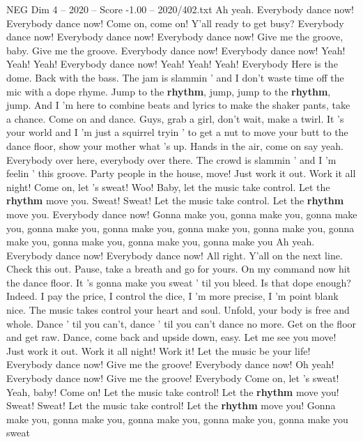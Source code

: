 \begin{textsample}{NEG Dim 4 – 2020 – Score -1.00 – 2020/402.txt}  \label{ex:f4_neg_028}
Ah yeah.
Everybody dance now!
Everybody dance now!
Come on, come on!
Y'all ready to get busy?
Everybody dance now!
Everybody dance now!
Everybody dance now!
Give me the groove, baby.
Give me the groove.
Everybody dance now!
Everybody dance now!
Yeah!
Yeah!
Yeah!
Everybody dance now!
Yeah!
Yeah!
Yeah!
Everybody Here is the dome.
Back with the bass.
The jam is slammin ' and I don't waste time off the mic with a dope rhyme.
Jump to the \textbf{rhythm}, jump, jump to the \textbf{rhythm}, jump.
And I 'm here to combine beats and lyrics to make the shaker pants, take a chance.
Come on and dance.
Guys, grab a girl, don't wait, make a twirl.
It 's your world and I 'm just a squirrel tryin ' to get a nut to move your butt to the dance floor, show your mother what 's up.
Hands in the air, come on say yeah.
Everybody over here, everybody over there.
The crowd is slammin ' and I 'm feelin ' this groove.
Party people in the house, move!
Just work it out.
Work it all night!
Come on, let 's sweat!
Woo!
Baby, let the music take control.
Let the \textbf{rhythm} move you.
Sweat!
Sweat!
Let the music take control.
Let the \textbf{rhythm} move you.
Everybody dance now!
Gonna make you, gonna make you, gonna make you, gonna make you, gonna make you, gonna make you, gonna make you, gonna make you, gonna make you, gonna make you, gonna make you Ah yeah.
Everybody dance now!
Everybody dance now!
All right.
Y'all on the next line.
Check this out.
Pause, take a breath and go for yours.
On my command now hit the dance floor.
It 's gonna make you sweat ' til you bleed.
Is that dope enough?
Indeed.
I pay the price, I control the dice, I 'm more precise, I 'm point blank nice.
The music takes control your heart and soul.
Unfold, your body is free and whole.
Dance ' til you can't, dance ' til you can't dance no more.
Get on the floor and get raw.
Dance, come back and upside down, easy.
Let me see you move!
Just work it out.
Work it all night!
Work it!
Let the music be your life!
Everybody dance now!
Give me the groove!
Everybody dance now!
Oh yeah!
Everybody dance now!
Give me the groove!
Everybody Come on, let 's sweat!
Yeah, baby!
Come on!
Let the music take control!
Let the \textbf{rhythm} move you!
Sweat!
Sweat!
Let the music take control!
Let the \textbf{rhythm} move you!
Gonna make you, gonna make you, gonna make you, gonna make you, gonna make you sweat

\end{textsample}
